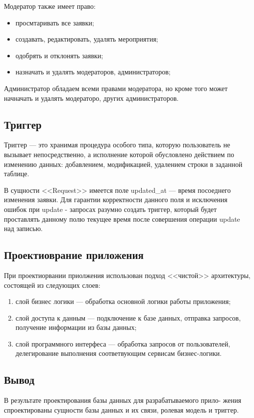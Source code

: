 Модератор также имеет право:
\begin{itemize}[label=---]
	\item просмтаривать все заявки;
	\item создавать, редактировать, удалять мероприятия;
	\item одобрять и отклонять заявки;
	\item назначать и удалять модераторов, администраторов;
\end{itemize}

Администратор обладаем всеми правами модератора, но кроме того может начначать и удалять модераторо, других администраторов.

\subsection{Триггер}

Триггер — это хранимая процедура особого типа, которую пользователь не вызывает непосредственно, а исполнение которой обусловлено действием по изменению данных: добавлением, модификацией, удалением строки в заданной таблице.

В сущности <<Request>> имеется поле updated{\_}at --- время посоеднего изменения заявки. Для гарантии корректности данного поля и исключения ошибок при update - запросах разумно создать триггер, который будет проставлять данному полю текущее время после совершения операции update над записью.

\subsection{Проектиоврание приложения}

При проектиорвании приолжения использован подход <<чистой>>\cite{clean-code} архитектуры, состоящей из следующих слоев:
\begin{enumerate}
	\item слой бизнес логики --- обработка основной логики работы приложения;
	\item слой доступа к данным --- подключение к базе данных, отправка запросов, получение информации из базы данных;
	\item слой программного интерфеса --- обработка запросов от пользователей, делегирование выполнения соответвующим сервисам бизнес-логики.
\end{enumerate}

\subsection{Вывод}

В результате проектирования базы данных для разрабатываемого прило-
жения спроектированы сущности базы данных и их связи, ролевая модель и триггер.

\pagebreak
